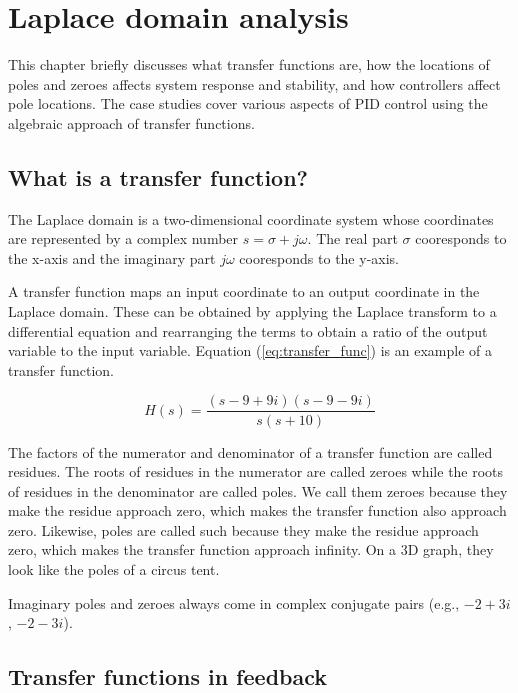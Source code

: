 
\chapter{Laplace domain analysis}

This chapter briefly discusses what transfer functions are, how the locations of
poles and zeroes affects system response and stability, and how controllers
affect pole locations. The case studies cover various aspects of PID control
using the algebraic approach of transfer functions.

\section{What is a transfer function?}

The Laplace domain is a two-dimensional coordinate system whose coordinates are
represented by a complex number $s = \sigma + j\omega$. The real part $\sigma$
cooresponds to the x-axis and the imaginary part $j\omega$ cooresponds to the
y-axis.

A transfer function maps an input coordinate to an output coordinate in the
Laplace domain. These can be obtained by applying the Laplace transform to a
differential equation and rearranging the terms to obtain a ratio of the output
variable to the input variable. Equation (\ref{eq:transfer_func}) is an example
of a transfer function.

\begin{equation} \label{eq:transfer_func}
  H(s) = \frac{(s-9+9i)(s-9-9i)}{s(s+10)}
\end{equation}

The factors of the numerator and denominator of a transfer function are called
residues. The roots of residues in the numerator are called zeroes while the
roots of residues in the denominator are called poles. We call them zeroes
because they make the residue approach zero, which makes the transfer function
also approach zero. Likewise, poles are called such because they make the
residue approach zero, which makes the transfer function approach infinity. On a
3D graph, they look like the poles of a circus tent.

Imaginary poles and zeroes always come in complex conjugate pairs (e.g.,
$-2 + 3i$, $-2 - 3i$).

\section{Transfer functions in feedback}


